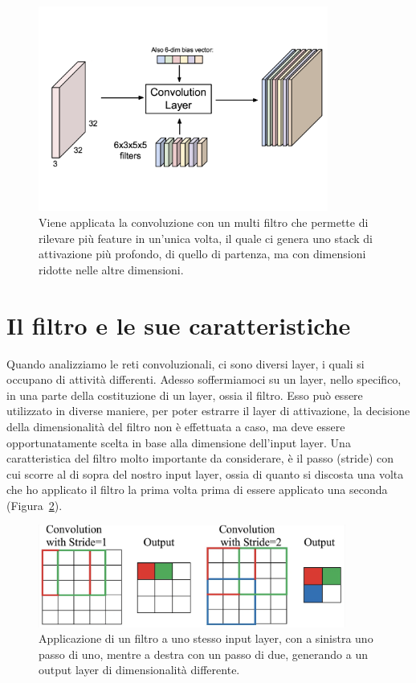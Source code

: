 \begin{figure}[htbp]
    \centering
    \includegraphics[width=0.85\textwidth]{figure/CNNConvolution2.png}
    \caption{Viene applicata la convoluzione con un multi filtro che permette di rilevare più feature in un'unica volta, il quale ci genera uno stack di attivazione più profondo, di quello di partenza, ma con dimensioni ridotte nelle altre dimensioni.}
    \label{fig:convolution_layer_multifilter}
\end{figure}

\section{Il filtro e le sue caratteristiche}

Quando analizziamo le reti convoluzionali, ci sono diversi layer, i quali si occupano di attività differenti. Adesso soffermiamoci su un layer, nello specifico, in una parte della costituzione di un layer, ossia il filtro. Esso può essere utilizzato in diverse maniere, per poter estrarre il layer di attivazione, la decisione della dimensionalità del filtro non è effettuata a caso, ma deve essere opportunatamente scelta in base alla dimensione dell'input layer. Una caratteristica del filtro molto importante da considerare, è il passo (stride) con cui scorre al di sopra del nostro input layer, ossia di quanto si discosta una volta che ho applicato il filtro la prima volta prima di essere applicato una seconda (Figura~\ref{fig:filter_stride}). 
\begin{figure}
    \centering
    \includegraphics[width=0.90\textwidth]{figure/Filtering_stride.png}
    \caption{Applicazione di un filtro a uno stesso input layer, con a sinistra uno passo di uno, mentre a destra con un passo di due, generando a un output layer di dimensionalità differente.}
    \label{fig:filter_stride}
\end{figure}

